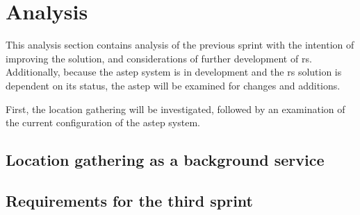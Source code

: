 \section{Analysis}
This analysis section contains analysis of the previous sprint with the intention of improving the solution, and considerations of further development of \gls{rs}.
Additionally, because the \gls{astep} system is in development and the \gls{rs} solution is dependent on its status, the \gls{astep} will be examined for changes and additions.

First, the location gathering will be investigated, followed by an examination of the current configuration of the \gls{astep} system.

\subsection{Location gathering as a background service} \label{ssec:LocationGatherBGS}






\subsection{Requirements for the third sprint}

